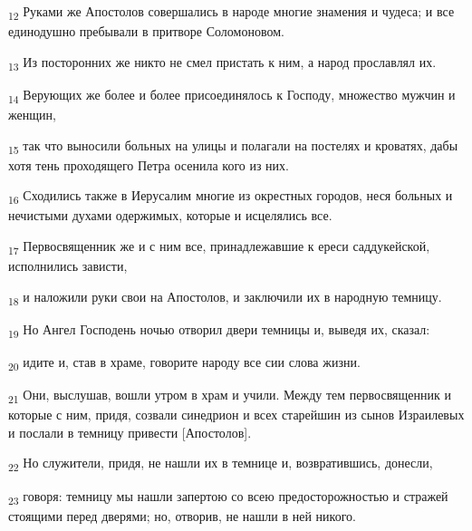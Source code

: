 \begin{tcolorbox}
\textsubscript{12} Руками же Апостолов совершались в народе многие знамения и чудеса; и все единодушно пребывали в притворе Соломоновом.
\end{tcolorbox}
\begin{tcolorbox}
\textsubscript{13} Из посторонних же никто не смел пристать к ним, а народ прославлял их.
\end{tcolorbox}
\begin{tcolorbox}
\textsubscript{14} Верующих же более и более присоединялось к Господу, множество мужчин и женщин,
\end{tcolorbox}
\begin{tcolorbox}
\textsubscript{15} так что выносили больных на улицы и полагали на постелях и кроватях, дабы хотя тень проходящего Петра осенила кого из них.
\end{tcolorbox}
\begin{tcolorbox}
\textsubscript{16} Сходились также в Иерусалим многие из окрестных городов, неся больных и нечистыми духами одержимых, которые и исцелялись все.
\end{tcolorbox}
\begin{tcolorbox}
\textsubscript{17} Первосвященник же и с ним все, принадлежавшие к ереси саддукейской, исполнились зависти,
\end{tcolorbox}
\begin{tcolorbox}
\textsubscript{18} и наложили руки свои на Апостолов, и заключили их в народную темницу.
\end{tcolorbox}
\begin{tcolorbox}
\textsubscript{19} Но Ангел Господень ночью отворил двери темницы и, выведя их, сказал:
\end{tcolorbox}
\begin{tcolorbox}
\textsubscript{20} идите и, став в храме, говорите народу все сии слова жизни.
\end{tcolorbox}
\begin{tcolorbox}
\textsubscript{21} Они, выслушав, вошли утром в храм и учили. Между тем первосвященник и которые с ним, придя, созвали синедрион и всех старейшин из сынов Израилевых и послали в темницу привести [Апостолов].
\end{tcolorbox}
\begin{tcolorbox}
\textsubscript{22} Но служители, придя, не нашли их в темнице и, возвратившись, донесли,
\end{tcolorbox}
\begin{tcolorbox}
\textsubscript{23} говоря: темницу мы нашли запертою со всею предосторожностью и стражей стоящими перед дверями; но, отворив, не нашли в ней никого.
\end{tcolorbox}
